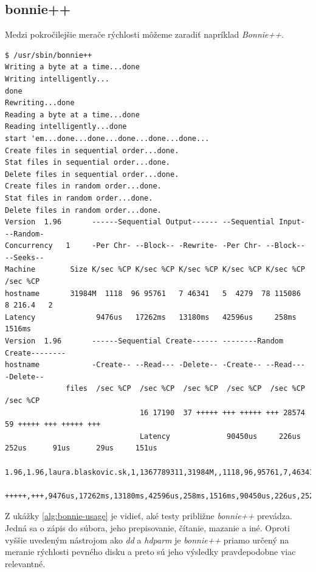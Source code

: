 %
%

\subsection{bonnie++}

Medzi pokročilejšie merače rýchlosti môžeme zaradiť napríklad \emph{Bonnie++}.

\renewcommand{\lstlistingname}{Ukážka}
\begin{lstlisting}[label=alg:bonnie-usage,caption=Príklad použitia nástroja Bonnie++]
$ /usr/sbin/bonnie++
Writing a byte at a time...done
Writing intelligently...
done
Rewriting...done
Reading a byte at a time...done
Reading intelligently...done
start 'em...done...done...done...done...done...
Create files in sequential order...done.
Stat files in sequential order...done.
Delete files in sequential order...done.
Create files in random order...done.
Stat files in random order...done.
Delete files in random order...done.
Version  1.96       ------Sequential Output------ --Sequential Input- --Random-
Concurrency   1     -Per Chr- --Block-- -Rewrite- -Per Chr- --Block-- --Seeks--
Machine        Size K/sec %CP K/sec %CP K/sec %CP K/sec %CP K/sec %CP  /sec %CP
hostname       31984M  1118  96 95761   7 46341   5  4279  78 115086   8 216.4   2
Latency              9476us   17262ms   13180ms   42596us     258ms    1516ms
Version  1.96       ------Sequential Create------ --------Random Create--------
hostname            -Create-- --Read--- -Delete-- -Create-- --Read--- -Delete--
              files  /sec %CP  /sec %CP  /sec %CP  /sec %CP  /sec %CP  /sec %CP
                               16 17190  37 +++++ +++ +++++ +++ 28574  59 +++++ +++ +++++ +++
                               Latency             90450us     226us     252us      91us      29us     151us
                               1.96,1.96,laura.blaskovic.sk,1,1367789311,31984M,,1118,96,95761,7,46341,5,4279,78,115086,8,216.4,2,16,,,,,17190,37,+++++,+++,+++++,+++,28574,59,+++++,+++,
                               +++++,+++,9476us,17262ms,13180ms,42596us,258ms,1516ms,90450us,226us,252us,91us,29us,151us
\end{lstlisting}
\renewcommand{\lstlistingname}{\listingAlgoritmus}

Z ukážky \ref{alg:bonnie-usage} je vidieť, aké testy približne \emph{bonnie++}
prevádza. Jedná sa o zápis do súbora, jeho prepisovanie, čítanie, mazanie a
iné. Oproti vyššie uvedeným nástrojom ako \emph{dd} a \emph{hdparm} je
\emph{bonnie++} priamo určený na meranie rýchlosti pevného disku a preto sú
jeho výsledky pravdepodobne viac relevantné.

